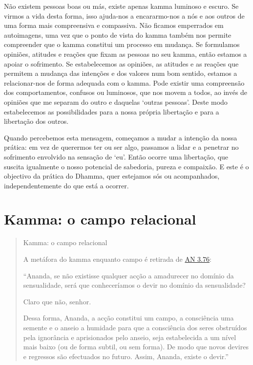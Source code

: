 Não existem pessoas boas ou más, existe apenas kamma luminoso e escuro. Se virmos a vida desta forma, isso ajuda-nos a encararmo-nos a nós e aos outros de uma forma mais compreensiva e compassiva. Não ficamos emperrados em autoimagens, uma vez que o ponto de vista do kamma também nos permite compreender que o kamma constitui um processo em mudança. Se formulamos opiniões, atitudes e reações que fixam as pessoas no seu kamma, então estamos a apoiar o sofrimento. Se estabelecemos as opiniões, as atitudes e as reações que permitem a mudança das intenções e dos valores num bom sentido, estamos a relacionar-nos de forma adequada com o kamma. Pode existir uma compreensão dos comportamentos, confusos ou luminosos, que nos movem a todos, ao invés de opiniões que me separam do outro e daquelas `outras pessoas'. Deste modo estabelecemos as possibilidades para a nossa própria libertação e para a libertação dos outros.

Quando percebemos esta mensagem, começamos a mudar a intenção da nossa prática: em vez de querermos ter ou ser algo, passamos a lidar e a penetrar no sofrimento envolvido na sensação de `eu'. Então ocorre uma libertação, que suscita igualmente o nosso potencial de sabedoria, pureza e compaixão. E este é o objectivo da prática do Dhamma, quer estejamos sós ou acompanhados, independentemente do que está a ocorrer.

\section{Kamma: o campo relacional}


\begin{quote}
  Kamma: o campo relacional

  A metáfora do kamma enquanto campo é retirada de \href{https://suttacentral.net/an3.76/en/thanissaro}{AN 3.76}:

  ``Ananda, se não existisse qualquer acção a amadurecer no domínio da sensualidade, será que conheceríamos o devir no domínio da sensualidade?

  Claro que não, senhor.

  Dessa forma, Ananda, a acção constitui um campo, a consciência uma semente e o anseio a humidade para que a consciência dos seres obstruídos pela ignorância e aprisionados pelo anseio, seja estabelecida a um nível mais baixo (ou de forma subtil, ou sem forma). De modo que novos devires e regressos são efectuados no futuro. Assim, Ananda, existe o devir.''
\end{quote}

